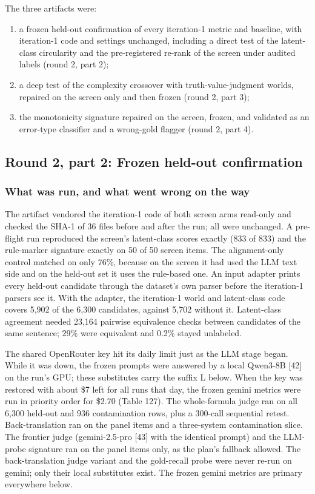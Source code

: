 \documentclass[11pt,letterpaper]{article}
\begin{document}
The three artifacts were:

\begin{enumerate}
\item {}a frozen held-out confirmation of every iteration-1 metric and baseline, with iteration-1 code and settings unchanged, including a direct test of the latent-class circularity and the pre-registered re-rank of the screen under audited labels (round 2, part 2);
\item {}a deep test of the complexity crossover with truth-value-judgment worlds, repaired on the screen only and then frozen (round 2, part 3);
\item {}the monotonicity signature repaired on the screen, frozen, and validated as an error-type classifier and a wrong-gold flagger (round 2, part 4).
\end{enumerate}
\subsection{Round 2, part 2: Frozen held-out confirmation}

\subsubsection{What was run, and what went wrong on the way}

The artifact vendored the iteration-1 code of both screen arms read-only and checked the SHA-1 of 36 files before and after the run; all were unchanged. A pre-flight run reproduced the screen's latent-class scores exactly (833 of 833) and the rule-marker signature exactly on 50 of 50 screen items. The alignment-only control matched on only 76\%, because on the screen it had used the LLM text side and on the held-out set it uses the rule-based one. An input adapter prints every held-out candidate through the dataset's own parser before the iteration-1 parsers see it. With the adapter, the iteration-1 world and latent-class code covers 5,902 of the 6,300 candidates, against 5,702 without it. Latent-class agreement needed 23,164 pairwise equivalence checks between candidates of the same sentence; 29\% were equivalent and 0.2\% stayed unlabeled.

The shared OpenRouter key hit its daily limit just as the LLM stage began. While it was down, the frozen prompts were answered by a local Qwen3-8B [42] on the run's GPU; these substitutes carry the suffix L below. When the key was restored with about \$7 left for all runs that day, the frozen gemini metrics were run in priority order for \$2.70 (Table 127). The whole-formula judge ran on all 6,300 held-out and 936 contamination rows, plus a 300-call sequential retest. Back-translation ran on the panel items and a three-system contamination slice. The frontier judge (gemini-2.5-pro [43] with the identical prompt) and the LLM-probe signature ran on the panel items only, as the plan's fallback allowed. The back-translation judge variant and the gold-recall probe were never re-run on gemini; only their local substitutes exist. The frozen gemini metrics are primary everywhere below.
\end{document}
